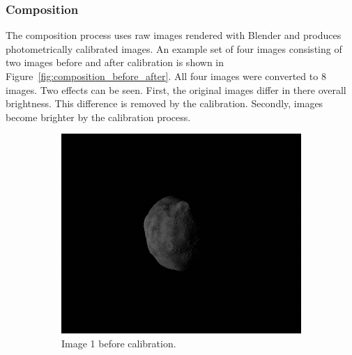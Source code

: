 \subsubsection{Composition}
The composition process uses raw images rendered with Blender and produces photometrically calibrated images. An example set of four images consisting of two images before and after calibration is shown in Figure~\ref{fig:composition_before_after}. All four images were converted to \SI{8}{\bit} images. Two effects can be seen. First, the original images differ in there overall brightness. This difference is removed by the calibration. Secondly, images become brighter by the calibration process. 

\begin{figure}[htb]
    \centering
        \begin{subfigure}[b]{0.48\textwidth}
            \centering
                \includegraphics[width=\textwidth]{doc/thesis/0_figures/rendering_lighting/SssbOnly_2017-08-15T115858-281000.jpg}
                \caption{Image 1 before calibration.}
                \label{fig:composition_before_1}
        \end{subfigure}
        \begin{subfigure}[b]{0.48\textwidth}
            \centering

\end{subfigure}
\end{figure}
